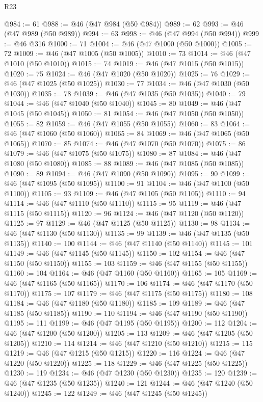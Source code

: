 \begin{lexlean}{R23}
\begin{coremodule}
{{{{{{{{{{{{{{{{{{{{{@984 := 61
@988 := @46 (@47 @984 (@50 @984))
@989 := 62
@993 := @46 (@47 @989 (@50 @989))
@994 := 63
@998 := @46 (@47 @994 (@50 @994))
@999 := @46 @316
@1000 := 71
@1004 := @46 (@47 @1000 (@50 @1000))
@1005 := 72
@1009 := @46 (@47 @1005 (@50 @1005))
@1010 := 73
@1014 := @46 (@47 @1010 (@50 @1010))
@1015 := 74
@1019 := @46 (@47 @1015 (@50 @1015))
@1020 := 75
@1024 := @46 (@47 @1020 (@50 @1020))
@1025 := 76
@1029 := @46 (@47 @1025 (@50 @1025))
@1030 := 77
@1034 := @46 (@47 @1030 (@50 @1030))
@1035 := 78
@1039 := @46 (@47 @1035 (@50 @1035))
@1040 := 79
@1044 := @46 (@47 @1040 (@50 @1040))
@1045 := 80
@1049 := @46 (@47 @1045 (@50 @1045))
@1050 := 81
@1054 := @46 (@47 @1050 (@50 @1050))
@1055 := 82
@1059 := @46 (@47 @1055 (@50 @1055))
@1060 := 83
@1064 := @46 (@47 @1060 (@50 @1060))
@1065 := 84
@1069 := @46 (@47 @1065 (@50 @1065))
@1070 := 85
@1074 := @46 (@47 @1070 (@50 @1070))
@1075 := 86
@1079 := @46 (@47 @1075 (@50 @1075))
@1080 := 87
@1084 := @46 (@47 @1080 (@50 @1080))
@1085 := 88
@1089 := @46 (@47 @1085 (@50 @1085))
@1090 := 89
@1094 := @46 (@47 @1090 (@50 @1090))
@1095 := 90
@1099 := @46 (@47 @1095 (@50 @1095))
@1100 := 91
@1104 := @46 (@47 @1100 (@50 @1100))
@1105 := 93
@1109 := @46 (@47 @1105 (@50 @1105))
@1110 := 94
@1114 := @46 (@47 @1110 (@50 @1110))
@1115 := 95
@1119 := @46 (@47 @1115 (@50 @1115))
@1120 := 96
@1124 := @46 (@47 @1120 (@50 @1120))
@1125 := 97
@1129 := @46 (@47 @1125 (@50 @1125))
@1130 := 98
@1134 := @46 (@47 @1130 (@50 @1130))
@1135 := 99
@1139 := @46 (@47 @1135 (@50 @1135))
@1140 := 100
@1144 := @46 (@47 @1140 (@50 @1140))
@1145 := 101
@1149 := @46 (@47 @1145 (@50 @1145))
@1150 := 102
@1154 := @46 (@47 @1150 (@50 @1150))
@1155 := 103
@1159 := @46 (@47 @1155 (@50 @1155))
@1160 := 104
@1164 := @46 (@47 @1160 (@50 @1160))
@1165 := 105
@1169 := @46 (@47 @1165 (@50 @1165))
@1170 := 106
@1174 := @46 (@47 @1170 (@50 @1170))
@1175 := 107
@1179 := @46 (@47 @1175 (@50 @1175))
@1180 := 108
@1184 := @46 (@47 @1180 (@50 @1180))
@1185 := 109
@1189 := @46 (@47 @1185 (@50 @1185))
@1190 := 110
@1194 := @46 (@47 @1190 (@50 @1190))
@1195 := 111
@1199 := @46 (@47 @1195 (@50 @1195))
@1200 := 112
@1204 := @46 (@47 @1200 (@50 @1200))
@1205 := 113
@1209 := @46 (@47 @1205 (@50 @1205))
@1210 := 114
@1214 := @46 (@47 @1210 (@50 @1210))
@1215 := 115
@1219 := @46 (@47 @1215 (@50 @1215))
@1220 := 116
@1224 := @46 (@47 @1220 (@50 @1220))
@1225 := 118
@1229 := @46 (@47 @1225 (@50 @1225))
@1230 := 119
@1234 := @46 (@47 @1230 (@50 @1230))
@1235 := 120
@1239 := @46 (@47 @1235 (@50 @1235))
@1240 := 121
@1244 := @46 (@47 @1240 (@50 @1240))
@1245 := 122
@1249 := @46 (@47 @1245 (@50 @1245))
}}}}}}}}}}}}}}}}}}}}}
\end{coremodule}
\end{lexlean}
